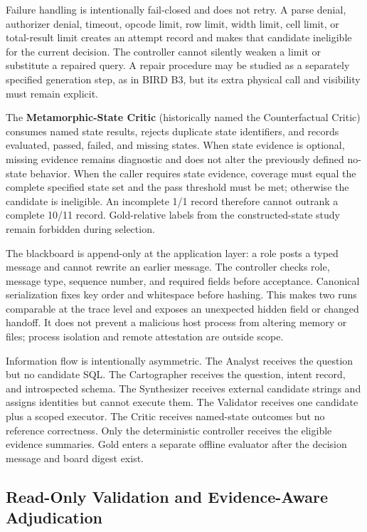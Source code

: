 \documentclass[applsci,article,submit,moreauthors]{Definitions/mdpi}
\begin{document}
Failure handling is intentionally fail-closed and does not retry. A parse denial, authorizer denial, timeout, opcode limit, row limit, width limit, cell limit, or total-result limit creates an attempt record and makes that candidate ineligible for the current decision. The controller cannot silently weaken a limit or substitute a repaired query. A repair procedure may be studied as a separately specified generation step, as in BIRD B3, but its extra physical call and visibility must remain explicit.

The \textbf{Metamorphic-State Critic} (historically named the Counterfactual Critic) consumes named state results, rejects duplicate state identifiers, and records evaluated, passed, failed, and missing states. When state evidence is optional, missing evidence remains diagnostic and does not alter the previously defined no-state behavior. When the caller requires state evidence, coverage must equal the complete specified state set and the pass threshold must be met; otherwise the candidate is ineligible. An incomplete 1/1 record therefore cannot outrank a complete 10/11 record. Gold-relative labels from the constructed-state study remain forbidden during selection.

The blackboard is append-only at the application layer: a role posts a typed message and cannot rewrite an earlier message. The controller checks role, message type, sequence number, and required fields before acceptance. Canonical serialization fixes key order and whitespace before hashing. This makes two runs comparable at the trace level and exposes an unexpected hidden field or changed handoff. It does not prevent a malicious host process from altering memory or files; process isolation and remote attestation are outside scope.

Information flow is intentionally asymmetric. The Analyst receives the question but no candidate SQL. The Cartographer receives the question, intent record, and introspected schema. The Synthesizer receives external candidate strings and assigns identities but cannot execute them. The Validator receives one candidate plus a scoped executor. The Critic receives named-state outcomes but no reference correctness. Only the deterministic controller receives the eligible evidence summaries. Gold enters a separate offline evaluator after the decision message and board digest exist.

\subsection{Read-Only Validation and Evidence-Aware Adjudication}
\end{document}
